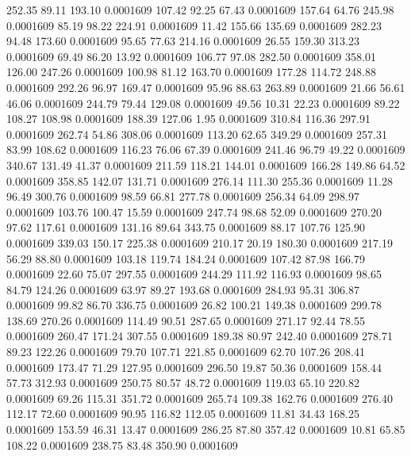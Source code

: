  252.35   89.11  193.10   0.0001609
 107.42   92.25   67.43   0.0001609
 157.64   64.76  245.98   0.0001609
  85.19   98.22  224.91   0.0001609
  11.42  155.66  135.69   0.0001609
 282.23   94.48  173.60   0.0001609
  95.65   77.63  214.16   0.0001609
  26.55  159.30  313.23   0.0001609
  69.49   86.20   13.92   0.0001609
 106.77   97.08  282.50   0.0001609
 358.01  126.00  247.26   0.0001609
 100.98   81.12  163.70   0.0001609
 177.28  114.72  248.88   0.0001609
 292.26   96.97  169.47   0.0001609
  95.96   88.63  263.89   0.0001609
  21.66   56.61   46.06   0.0001609
 244.79   79.44  129.08   0.0001609
  49.56   10.31   22.23   0.0001609
  89.22  108.27  108.98   0.0001609
 188.39  127.06    1.95   0.0001609
 310.84  116.36  297.91   0.0001609
 262.74   54.86  308.06   0.0001609
 113.20   62.65  349.29   0.0001609
 257.31   83.99  108.62   0.0001609
 116.23   76.06   67.39   0.0001609
 241.46   96.79   49.22   0.0001609
 340.67  131.49   41.37   0.0001609
 211.59  118.21  144.01   0.0001609
 166.28  149.86   64.52   0.0001609
 358.85  142.07  131.71   0.0001609
 276.14  111.30  255.36   0.0001609
  11.28   96.49  300.76   0.0001609
  98.59   66.81  277.78   0.0001609
 256.34   64.09  298.97   0.0001609
 103.76  100.47   15.59   0.0001609
 247.74   98.68   52.09   0.0001609
 270.20   97.62  117.61   0.0001609
 131.16   89.64  343.75   0.0001609
  88.17  107.76  125.90   0.0001609
 339.03  150.17  225.38   0.0001609
 210.17   20.19  180.30   0.0001609
 217.19   56.29   88.80   0.0001609
 103.18  119.74  184.24   0.0001609
 107.42   87.98  166.79   0.0001609
  22.60   75.07  297.55   0.0001609
 244.29  111.92  116.93   0.0001609
  98.65   84.79  124.26   0.0001609
  63.97   89.27  193.68   0.0001609
 284.93   95.31  306.87   0.0001609
  99.82   86.70  336.75   0.0001609
  26.82  100.21  149.38   0.0001609
 299.78  138.69  270.26   0.0001609
 114.49   90.51  287.65   0.0001609
 271.17   92.44   78.55   0.0001609
 260.47  171.24  307.55   0.0001609
 189.38   80.97  242.40   0.0001609
 278.71   89.23  122.26   0.0001609
  79.70  107.71  221.85   0.0001609
  62.70  107.26  208.41   0.0001609
 173.47   71.29  127.95   0.0001609
 296.50   19.87   50.36   0.0001609
 158.44   57.73  312.93   0.0001609
 250.75   80.57   48.72   0.0001609
 119.03   65.10  220.82   0.0001609
  69.26  115.31  351.72   0.0001609
 265.74  109.38  162.76   0.0001609
 276.40  112.17   72.60   0.0001609
  90.95  116.82  112.05   0.0001609
  11.81   34.43  168.25   0.0001609
 153.59   46.31   13.47   0.0001609
 286.25   87.80  357.42   0.0001609
  10.81   65.85  108.22   0.0001609
 238.75   83.48  350.90   0.0001609

